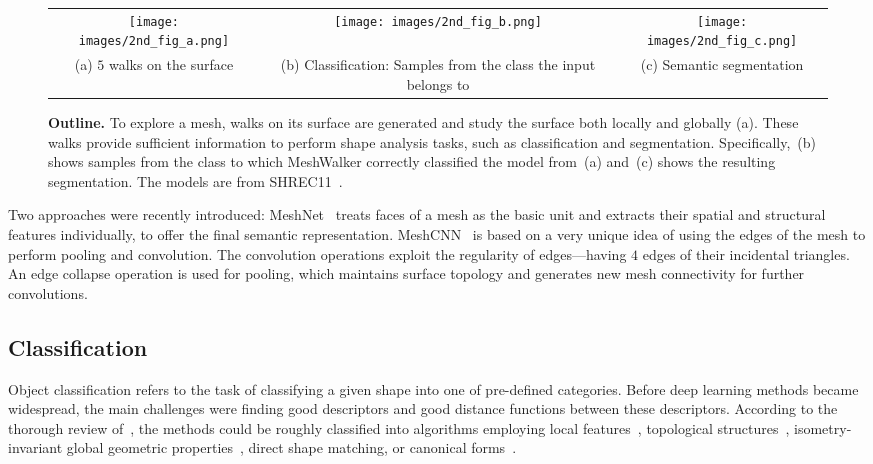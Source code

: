 \documentclass[acmtog]{acmart}
\begin{document}
\begin{figure*}[tb]
\centering 
\begin{tabular}{ccc}
\texttt{[image: images/2nd\_fig\_a.png]} &
\texttt{[image: images/2nd\_fig\_b.png]} &
\texttt{[image: images/2nd\_fig\_c.png]}  \\
(a) $5$ walks on the surface & (b) Classification: Samples from the class the input belongs to& (c) Semantic segmentation
\end{tabular}
\caption{{\bf Outline.}
To explore a mesh, walks on its surface are generated and study the surface both locally and globally (a).
These walks provide sufficient information to perform shape analysis tasks, such as classification and segmentation.
Specifically,~(b) shows samples from the class to which MeshWalker correctly classified the model from~(a) and~(c) shows the resulting segmentation.
The models are from SHREC11~\cite{lian2011shape}.
}
\label{fig:outline} 
\end{figure*}


Two approaches were recently introduced:
MeshNet~\cite{feng2019meshnet} treats faces of a mesh as the basic unit and  extracts their spatial and structural features individually, to offer the final semantic representation.
MeshCNN~\cite{hanocka2019meshcnn} is based on a very unique idea of using the edges of the mesh to perform pooling and convolution. 
The convolution operations exploit the regularity of edges---having $4$ edges of their incidental triangles.
An edge collapse operation is used for pooling, which maintains surface topology and generates new mesh connectivity for further convolutions.

\subsection{Classification}
\label{subsec:related_work_classification}
Object classification refers to the task of classifying a given shape into one of pre-defined categories.
Before deep learning methods became widespread, the main challenges were finding good descriptors and good distance functions between these descriptors.
According to the thorough  review of~\cite{lian2013comparison}, the methods could be roughly classified into algorithms employing local features~\cite{johnson1999using, lowe2004distinctive, liu2006shape, sun2009concise, ovsjanikov2009shape}, topological structures~\cite{hilaga2001topology, sundar2003skeleton, tam2007deformable}, isometry-invariant global geometric properties~\cite{reuter2005laplace, jain2007spectral, mahmoudi2009three}, 
direct shape matching, or canonical forms~\cite{memoli2005theoretical, memoli2007use, bronstein2006efficient, elad2003bending}.
\end{document}
